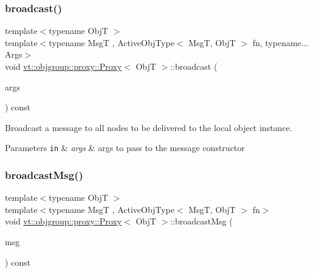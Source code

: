 \subsubsection{\texorpdfstring{broadcast()}{broadcast()}\hspace{0.1cm}{\footnotesize\ttfamily [3/3]}}
{\footnotesize\ttfamily template$<$typename ObjT $>$ \\
template$<$typename MsgT , Active\+Obj\+Type$<$ Msg\+T, Obj\+T $>$ fn, typename... Args$>$ \\
void \hyperlink{structvt_1_1objgroup_1_1proxy_1_1_proxy}{vt\+::objgroup\+::proxy\+::\+Proxy}$<$ ObjT $>$\+::broadcast (\begin{DoxyParamCaption}\item[{Args \&\&...}]{args }\end{DoxyParamCaption}) const}



Broadcast a message to all nodes to be delivered to the local object instance. 


\begin{DoxyParams}[1]{Parameters}
\mbox{\tt in}  & {\em args} & args to pass to the message constructor \\
\hline
\end{DoxyParams}
\mbox{\label{structvt_1_1objgroup_1_1proxy_1_1_proxy_adf7096198908bb265516b3206452d73a}} 
\subsubsection{\texorpdfstring{broadcast\+Msg()}{broadcastMsg()}}
{\footnotesize\ttfamily template$<$typename ObjT $>$ \\
template$<$typename MsgT , Active\+Obj\+Type$<$ Msg\+T, Obj\+T $>$ fn$>$ \\
void \hyperlink{structvt_1_1objgroup_1_1proxy_1_1_proxy}{vt\+::objgroup\+::proxy\+::\+Proxy}$<$ ObjT $>$\+::broadcast\+Msg (\begin{DoxyParamCaption}\item[{\hyperlink{structvt_1_1messaging_1_1_msg_ptr_thief}{messaging\+::\+Msg\+Ptr\+Thief}$<$ MsgT $>$}]{msg }\end{DoxyParamCaption}) const}



